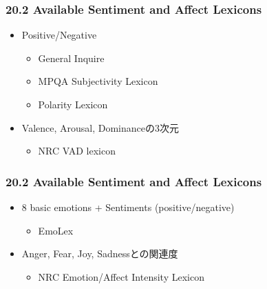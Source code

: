 
\begin{frame}
    \frametitle{20.2 Available Sentiment and Affect Lexicons}
    \begin{itemize}
        \item Positive/Negative
        \begin{itemize}
            \item General Inquire 
            \item MPQA Subjectivity Lexicon 
            \item Polarity Lexicon 
        \end{itemize}
    \end{itemize}
    \begin{itemize}
        \item Valence, Arousal, Dominanceの3次元
        \begin{itemize}
            \item NRC VAD lexicon 
        \end{itemize}
    \end{itemize}
\end{frame}


\begin{frame}
    \frametitle{20.2 Available Sentiment and Affect Lexicons}
    \begin{itemize}
        \item 8 basic emotions + Sentiments {\small (positive/negative)}
        \begin{itemize}
            \item EmoLex 
        \end{itemize}
    \end{itemize}
    \begin{itemize}
        \item Anger, Fear, Joy, Sadnessとの関連度
        \begin{itemize}
            \item NRC Emotion/Affect Intensity Lexicon 
        \end{itemize}
    \end{itemize}
\end{frame}



